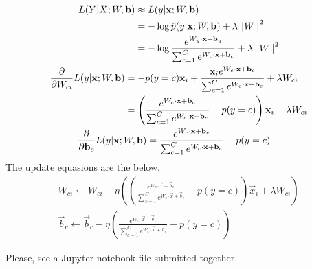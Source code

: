 \documentclass{introtosml}
\newcommand{\x}{\vec{x}}
\newcommand{\bb}{\vec{b}}
\begin{document}
\begin{p}
  \item
    \begin{gather*}
      \begin{aligned}
        L(Y|X; W, \bb)
        & \approx L(y|\x; W, \bb) \\
        & = - \log \hat{p}(y|\x; W, \bb) + \lambda \norm{W}^2 \\
        & = - \log \frac{e^{W_y \cdot \x + \bb_y}}{\sum_{c=1}^C e^{W_c \cdot \x + \bb_c}}
            + \lambda \norm{W}^2
      \end{aligned} \\
      \begin{aligned}
        \frac{\partial}{\partial W_{ci}} L(y|\x; W, \bb)
        & = - p(y=c) \x_i + \frac{\x_i e^{W_c \cdot \x + \bb_c}}
                                 {\sum_{c=1}^C e^{W_c \cdot \x + \bb_c}}
            + \lambda W_{ci} \\
        & = \left(\frac{e^{W_c \cdot \x + \bb_c}}{\sum_{c=1}^C e^{W_c \cdot \x + \bb_c}}
            - p(y=c)\right) \x_i + \lambda W_{ci}
      \end{aligned} \\
      \begin{aligned}
        \frac{\partial}{\partial \bb_{c}} L(y|\x; W, \bb)
        & = \frac{e^{W_c \cdot \x + \bb_c}}{\sum_{c=1}^C e^{W_c \cdot \x + \bb_c}} - p(y=c)
      \end{aligned} \\
    \end{gather*}
    \therefore The update equasions are the below.
    \begin{gather*}
      W_{ci} \leftarrow W_{ci} - \eta
      \left(\left(\frac{e^{W_c \cdot \x + \bb_c}}{\sum_{c=1}^C e^{W_c \cdot \x + \bb_c}}
            - p(y=c)\right) \x_i + \lambda W_{ci}\right) \\
      \bb_c \leftarrow \bb_c - \eta
      \left( \frac{e^{W_c \cdot \x + \bb_c}}
                  {\sum_{c=1}^C e^{W_c \cdot \x + \bb_c}} - p(y=c)\right)
    \end{gather*}

  \item
    Please, see a Jupyter notebook file submitted together.
\end{p}
\end{document}
